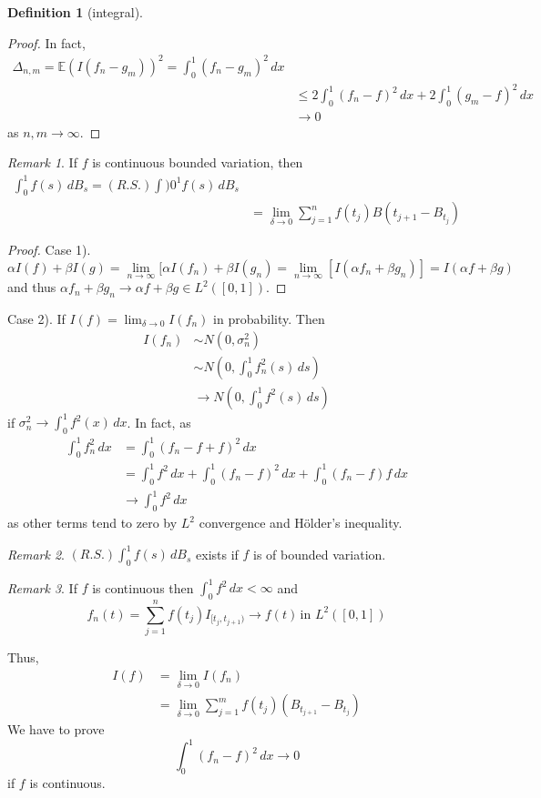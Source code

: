 \documentclass[10pt, oneside, reqno]{amsart}
\theoremstyle{plain}%
\theoremstyle{definition}
\newtheorem{defn}[thm]{Definition}
\theoremstyle{remark}
\newtheorem*{rem}{Remark}
\newcommand{\E}{\mathbb{E}}
\begin{document}
\begin{defn}[\ito integral]
\begin{proof}
		In fact, \begin{align*} 
			\Delta_{n,m} = \E(I(f_n - g_m))^2 = \int_0^1 (f_n - g_m)^2 \, dx \\
						&\leq 2 \int_0^1 ( f_n - f)^2 \, dx + 2 \int_0^1 (g_m - f)^2 \, dx \\
						&\rightarrow 0
		\end{align*} as $n,m \rightarrow \infty$.  
	\end{proof}
	
	\begin{rem}
		If $f$ is continuous bounded variation, then 
		\begin{align*}
			\int_0^1 f(s) \, dB_s = (R.S.) \int)0^1 f(s) \, dB_s \\
				&= \lim_{\delta \rightarrow 0} \sum_{j=1}^n f(t_j) B(t_{j+1} - B_{t_j})
 		\end{align*}
	\end{rem}
	\begin{proof}
	Case 1).
		\[
			\alpha I(f) + \beta I(g) = \lim_{n \rightarrow \infty} [ \alpha I(f_n) + \beta I(g_n) = \lim_{n \rightarrow \infty} [ I(\alpha f_n + \beta g_n)] = I(\alpha f + \beta g)
		\]
		and thus $\alpha f_n + \beta g_n \rightarrow \alpha f + \beta g \in L^2([0,1])$.   
	\end{proof}
	
	Case 2).  If $I(f) = \lim_{ \delta \rightarrow 0} I(f_n)$ in probability.  Then 
	\begin{align*}
		I(f_n) &\sim N(0, \sigma_n^2) \\
				&\sim N(0, \int_0^1 f_n^2(s) \,ds) \\
				&\rightarrow N(0, \int_0^1 f^2(s) \, ds)	
	\end{align*} if $\sigma^2_n \rightarrow \int_0^1 f^2(x) \, dx$.  In fact, as 
	\begin{align*}
		\int_0^1 f_n^2 \, dx &= \int_0^1 (f_n - f + f)^2 \, dx \\
								&= \int_0^1 f^2 \, dx + \int_0^1 (f_n - f)^2 \, dx + \int_0^1 (f_n - f) f \, dx\\
								&\rightarrow \int_0^1 f^2 \, dx
	\end{align*} as other terms tend to zero by $L^2$ convergence and H\"older's inequality.
	
	\begin{rem}
		$(R.S.) \int_0^1 f(s) \, dB_s$ exists if $f$ is of bounded variation.
	\end{rem}
	
	\begin{rem}
		If $f$ is continuous then $\int_0^1 f^2 \, dx < \infty$ and \[
			f_n(t) = \sum_{j=1}^n f(t_j) I_{[t_j, t_{j+1})} \rightarrow f(t) \, \text{in $L^2([0,1])$}
			\]
			
		Thus, \begin{align*}
			I(f) 	&= \lim_{\delta \rightarrow 0} I(f_n) \\
					&= \lim_{\delta \rightarrow 0} \sum_{j=1}^m f(t_j) (B_{t_{j+1}} - B_{t_j})
		\end{align*}
		We have to prove \[
			\int_0^1 (f_n - f)^2 \, dx \rightarrow 0
		\] if $f$ is continuous.
	\end{rem}
	
\end{defn}
\end{document}
